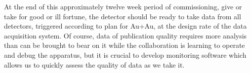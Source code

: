 At the end of this approximately twelve week period of commissioning, give or take for
good or ill fortune, the detector should be ready to take data from all detectors, triggered
according to plan for Au+Au, at the design rate of the data acquisition system.
Of course, data of publication quality requires more analysis than can be brought to bear 
on it while the collaboration is learning to operate and debug the apparatus, but it is
crucial to develop monitoring software which allows us to quickly assess the quality of
data as we take it.
